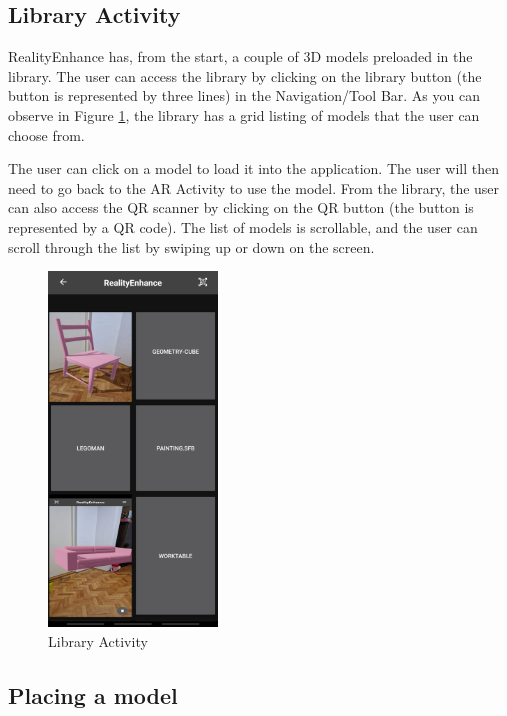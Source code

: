 \subsection{Library Activity}
RealityEnhance has, from the start, a couple of \ac{3D} models preloaded in the library. The user can access the library by clicking on the library button (the button is represented by three  lines) in the Navigation/Tool Bar. As you can observe in Figure \ref{fig:library}, the library has a grid listing of models that the user can choose from.

The user can click on a model to load it into the application. The user will then need to go back to the AR Activity to use the model. From the library, the user can also access the QR scanner by clicking on the QR button (the button is represented by a QR code). The list of models is scrollable, and the user can scroll through the list by swiping up or down on the screen.

\begin{figure}[ht]
    \begin{center}
        \includegraphics[width=0.4\textwidth]{img/App_screenshots/Library.jpg}
        \caption{Library Activity}
        \label{fig:library}
    \end{center}
\end{figure}

\pagebreak

\subsection{Placing a model}

